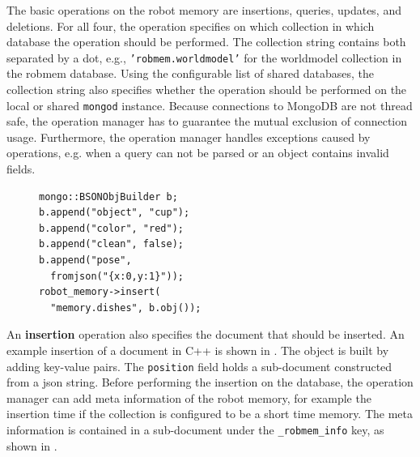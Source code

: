 The basic operations on the robot memory are insertions, queries,
updates, and deletions. For all four, the operation specifies on which
collection in which database the operation should be performed. The
collection string contains both separated by a dot,
e.g., \texttt{'robmem.worldmodel'} for the worldmodel collection in
the robmem database. Using
the configurable list of shared databases, the collection string also
specifies whether the operation should be performed on the local or
shared \texttt{mongod} instance. Because connections to MongoDB
are not thread safe, the operation manager has to guarantee the
mutual exclusion of connection usage. Furthermore, the operation
manager handles exceptions caused by operations, e.g. when a query can
not be parsed or an object contains invalid fields.

\begin{figure}
  \vspace{-0.4cm}
\begin{lstlisting}[style=SmallCpp,
  caption={Inserting a document about a red cup in C++},
  label=lst:impl-insert,
  framexleftmargin=5pt, xleftmargin=0pt,
 morekeywords={}, numbers=none]
mongo::BSONObjBuilder b;
b.append("object", "cup");
b.append("color", "red");
b.append("clean", false);
b.append("pose",
  fromjson("{x:0,y:1}"));
robot_memory->insert(
  "memory.dishes", b.obj());
\end{lstlisting}
\vspace{-8mm}
\end{figure}
An \textbf{insertion} operation also specifies the document that
should be inserted. An example insertion of a document in C++ is
shown in . The object is built by adding
key-value pairs. The \texttt{position} field holds a sub-document
constructed from a json string. Before performing the insertion on the database,
the operation manager can add meta information of the robot memory,
for example the insertion time if the collection is configured to be a
short time memory. The meta information is contained in a sub-document
under the \texttt{\_robmem\_info} key, as shown in
.

